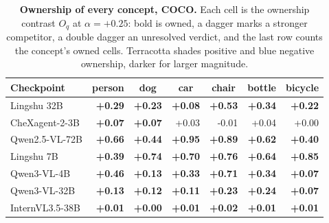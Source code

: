 \documentclass{article}
\begin{document}
\begin{table}[htbp]
\centering
\scriptsize
\setlength{\tabcolsep}{4pt}
\caption{\textbf{Ownership of every concept, COCO.} Each cell is the ownership contrast $O_q$ at $\alpha=+0.25$: bold is owned, a dagger marks a stronger competitor, a double dagger an unresolved verdict, and the last row counts the concept's owned cells. Terracotta shades positive and blue negative ownership, darker for larger magnitude.}
\label{tab:cf-own-coco}
\begin{tabular}{lrrrrrr}
\toprule
Checkpoint & \multicolumn{1}{c}{person} & \multicolumn{1}{c}{dog} & \multicolumn{1}{c}{car} & \multicolumn{1}{c}{chair} & \multicolumn{1}{c}{bottle} & \multicolumn{1}{c}{bicycle}\\
\midrule
Lingshu 32B & \cellcolor{cfTerra4}\textbf{+0.29} & \cellcolor{cfTerra3}\textbf{+0.23} & \cellcolor{cfTerra2}\textbf{+0.08} & \cellcolor{cfTerra4}\textbf{+0.53} & \cellcolor{cfTerra4}\textbf{+0.34} & \cellcolor{cfTerra3}\textbf{+0.22} \\
CheXagent-2-3B & \cellcolor{cfTerra2}\textbf{+0.07} & \cellcolor{cfTerra2}\textbf{+0.07} & \cellcolor{cfTerra2}+0.03 & \cellcolor{cfSlate1}-0.01 & \cellcolor{cfTerra2}+0.04 & \cellcolor{cfTerra1}+0.00 \\
Qwen2.5-VL-72B & \cellcolor{cfTerra4}\textbf{+0.66} & \cellcolor{cfTerra4}\textbf{+0.44} & \cellcolor{cfTerra4}\textbf{+0.95} & \cellcolor{cfTerra4}\textbf{+0.89} & \cellcolor{cfTerra4}\textbf{+0.62} & \cellcolor{cfTerra4}\textbf{+0.40} \\
Lingshu 7B & \cellcolor{cfTerra4}\textbf{+0.39} & \cellcolor{cfTerra4}\textbf{+0.74} & \cellcolor{cfTerra4}\textbf{+0.70} & \cellcolor{cfTerra4}\textbf{+0.76} & \cellcolor{cfTerra4}\textbf{+0.64} & \cellcolor{cfTerra4}\textbf{+0.85} \\
Qwen3-VL-4B & \cellcolor{cfTerra4}\textbf{+0.46} & \cellcolor{cfTerra3}\textbf{+0.13} & \cellcolor{cfTerra4}\textbf{+0.33} & \cellcolor{cfTerra4}\textbf{+0.71} & \cellcolor{cfTerra4}\textbf{+0.34} & \cellcolor{cfTerra2}\textbf{+0.07} \\
Qwen3-VL-32B & \cellcolor{cfTerra3}\textbf{+0.13} & \cellcolor{cfTerra3}\textbf{+0.12} & \cellcolor{cfTerra3}\textbf{+0.11} & \cellcolor{cfTerra3}\textbf{+0.23} & \cellcolor{cfTerra3}\textbf{+0.24} & \cellcolor{cfTerra2}\textbf{+0.07} \\
InternVL3.5-38B & \cellcolor{cfTerra1}\textbf{+0.01} & \cellcolor{cfTerra1}\textbf{+0.00} & \cellcolor{cfTerra1}\textbf{+0.01} & \cellcolor{cfTerra1}\textbf{+0.02} & \cellcolor{cfTerra1}\textbf{+0.01} & \cellcolor{cfTerra1}\textbf{+0.01} \\

\end{tabular}
\end{table}
\end{document}
